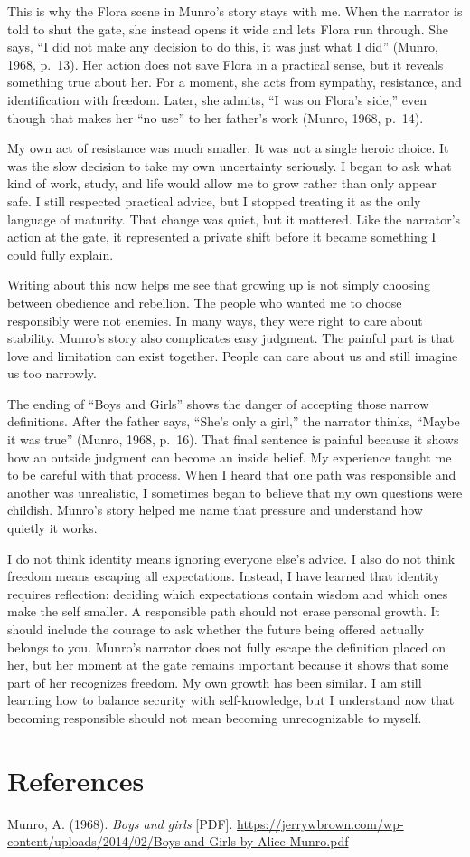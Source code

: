 \documentclass[12pt]{article}
\begin{document}
This is why the Flora scene in Munro's story stays with me. When the narrator is told to shut the gate, she instead opens it wide and lets Flora run through. She says, ``I did not make any decision to do this, it was just what I did'' (Munro, 1968, p.~13). Her action does not save Flora in a practical sense, but it reveals something true about her. For a moment, she acts from sympathy, resistance, and identification with freedom. Later, she admits, ``I was on Flora's side,'' even though that makes her ``no use'' to her father's work (Munro, 1968, p.~14).

My own act of resistance was much smaller. It was not a single heroic choice. It was the slow decision to take my own uncertainty seriously. I began to ask what kind of work, study, and life would allow me to grow rather than only appear safe. I still respected practical advice, but I stopped treating it as the only language of maturity. That change was quiet, but it mattered. Like the narrator's action at the gate, it represented a private shift before it became something I could fully explain.

Writing about this now helps me see that growing up is not simply choosing between obedience and rebellion. The people who wanted me to choose responsibly were not enemies. In many ways, they were right to care about stability. Munro's story also complicates easy judgment. The painful part is that love and limitation can exist together. People can care about us and still imagine us too narrowly.

The ending of ``Boys and Girls'' shows the danger of accepting those narrow definitions. After the father says, ``She's only a girl,'' the narrator thinks, ``Maybe it was true'' (Munro, 1968, p.~16). That final sentence is painful because it shows how an outside judgment can become an inside belief. My experience taught me to be careful with that process. When I heard that one path was responsible and another was unrealistic, I sometimes began to believe that my own questions were childish. Munro's story helped me name that pressure and understand how quietly it works.

I do not think identity means ignoring everyone else's advice. I also do not think freedom means escaping all expectations. Instead, I have learned that identity requires reflection: deciding which expectations contain wisdom and which ones make the self smaller. A responsible path should not erase personal growth. It should include the courage to ask whether the future being offered actually belongs to you. Munro's narrator does not fully escape the definition placed on her, but her moment at the gate remains important because it shows that some part of her recognizes freedom. My own growth has been similar. I am still learning how to balance security with self-knowledge, but I understand now that becoming responsible should not mean becoming unrecognizable to myself.

\clearpage

\section*{References}

\hangindent=0.5in\noindent Munro, A. (1968). \textit{Boys and girls} [PDF]. \url{https://jerrywbrown.com/wp-content/uploads/2014/02/Boys-and-Girls-by-Alice-Munro.pdf}
\end{document}
